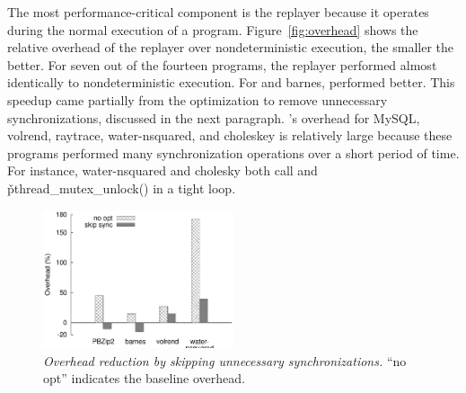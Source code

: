 
The most performance-critical component is the replayer because it
operates during the normal execution of a program.
Figure~\ref{fig:overhead} shows the relative overhead of the replayer over
nondeterministic execution, the smaller the better.  For seven out of
the fourteen programs, the replayer performed almost identically to
nondeterministic execution. For \pbzip and barnes, \tern performed
better.  This speedup came partially from the optimization to remove
unnecessary synchronizations, discussed in the next paragraph.  \tern's overhead
for MySQL, volrend, raytrace, water-nsquared, and choleskey is relatively
large because these programs performed many synchronization operations
over a short period of time.  For instance, water-nsquared and cholesky
both call  and \v{pthread\_mutex\_unlock()} in a
tight loop.



\begin{figure}[t]
\centering
\includegraphics[width=0.5\textwidth]{tern/figures/opt-overhead}
\caption{\small {\em Overhead reduction by skipping unnecessary
    synchronizations.} ``no opt'' indicates the baseline overhead.}
\label{fig:opt-remove-sync}
\end{figure}


